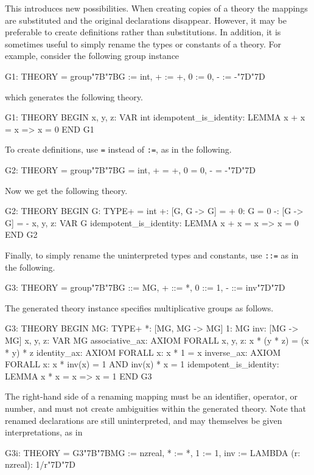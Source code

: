 \documentclass[11pt,twoside,openright,titlepage]{cslreport}
\def\mapb{\char"7B\char"7B}
\def\mape{\char"7D\char"7D}
\begin{document}
This introduces new possibilities.  When creating copies of a theory the
mappings are substituted and the original declarations disappear.
However, it may be preferable to create definitions rather than
substitutions.  In addition, it is sometimes useful to simply rename the
types or constants of a theory.  For example, consider the following group
instance
\begin{session}
G1: THEORY = group\mapb{}G := int, + := +, 0 := 0, - := -\mape{}
\end{session}
\noindent which generates the following theory.
\label{group-instances-start}
\begin{session}
G1: THEORY
 BEGIN
  x, y, z: VAR int
  idempotent_is_identity: LEMMA x + x = x => x = 0
 END G1
\end{session}
To create definitions, use \texttt{=} instead of \texttt{:=}, as
in the following.
\begin{session}
G2: THEORY = group\mapb{}G = int, + = +, 0 = 0, - = -\mape{}
\end{session}
\noindent Now we get the following theory.
\begin{session}
G2: THEORY
 BEGIN
  G: TYPE+ = int
  +: [G, G -> G] = +
  0: G = 0
  -: [G -> G] = -
  x, y, z: VAR G
  idempotent_is_identity: LEMMA x + x = x => x = 0
 END G2
\end{session}
Finally, to simply rename the uninterpreted types and constants, use
\texttt{::=} as in the following.
\begin{session}
G3: THEORY = group\mapb{}G ::= MG, + ::= *, 0 ::= 1, - ::= inv\mape{}
\end{session}
\noindent The generated theory instance specifies multiplicative groups as
follows.
\begin{session}
G3: THEORY
 BEGIN
  MG: TYPE+
  *: [MG, MG -> MG]
  1: MG
  inv: [MG -> MG]
  x, y, z: VAR MG
  associative_ax: AXIOM FORALL x, y, z: x * (y * z) = (x * y) * z
  identity_ax: AXIOM FORALL x: x * 1 = x
  inverse_ax: AXIOM FORALL x: x * inv(x) = 1 AND inv(x) * x = 1
  idempotent_is_identity: LEMMA x * x = x => x = 1
 END G3
\end{session}
The right-hand side of a renaming mapping must be an identifier, operator,
or number, and must not create ambiguities within the generated theory.
Note that renamed declarations are still uninterpreted, and may themselves
be given interpretations, as in
\begin{session}
G3i: THEORY = G3\mapb{}MG := nzreal, * := *, 1 := 1,
                  inv := LAMBDA (r: nzreal): 1/r\mape{}
\end{session}
\end{document}
